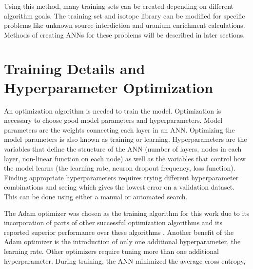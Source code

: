 \documentclass[tocnosub,noragright,centerchapter,12pt,fullpage]{uiucecethesis09}
\begin{document}
Using this method, many training sets can be created depending on different algorithm goals. The training set and isotope library can be modified for specific problems like unknown source interdiction and uranium enrichment calculations. Methods of creating ANNs for these problems will be described in later sections.




\section{Training Details and Hyperparameter Optimization}

An optimization algorithm is needed to train the model. Optimization is necessary to choose good model parameters and hyperparameters. Model parameters are the weights connecting each layer in an ANN. Optimizing the model parameters is also known as training or learning. Hyperparameters are the variables that define the structure of the ANN (number of layers, nodes in each layer, non-linear function on each node) as well as the variables that control how the model learns (the learning rate, neuron dropout frequency, loss function). Finding appropriate hyperparameters requires trying different hyperparameter combinations and seeing which gives the lowest error on a validation dataset. This can be done using either a manual or automated search.

The Adam optimizer was chosen as the training algorithm for this work due to its incorporation of parts of other successful optimization algorithms and its reported superior performance over these algorithms \cite{Kingma2015}. Another benefit of the Adam optimizer is the introduction of only one additional hyperparameter, the learning rate. Other optimizers require tuning more than one additional hyperparameter. During training, the ANN minimized the average cross entropy,
\end{document}
